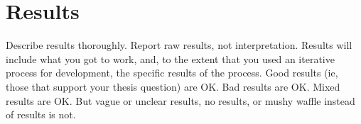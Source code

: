 \chapter{Results}
Describe results thoroughly. Report raw results, not interpretation. Results will include what you got to work, and, to the extent that you used an iterative process for development, the specific results of the process. Good results (ie, those that support your thesis question) are OK. Bad results are OK. Mixed results are OK. But vague or unclear results, no results, or mushy waffle instead of results is not.